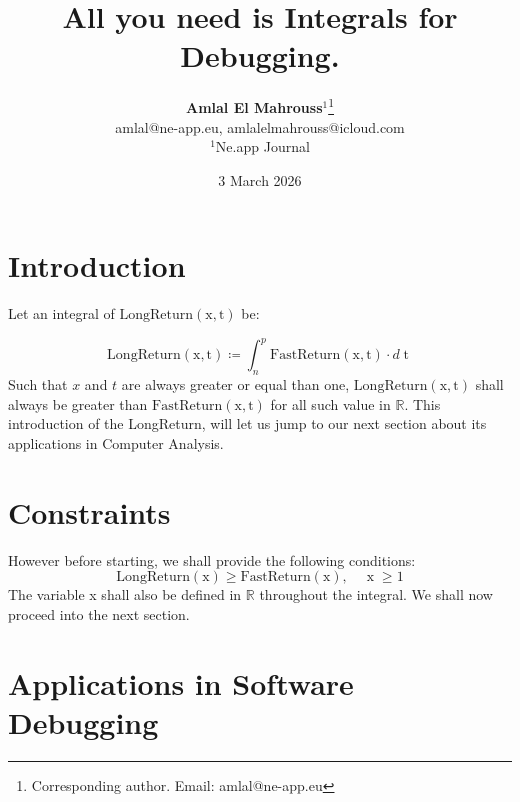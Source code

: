 \documentclass[10pt, twocolumn]{article}
\title{%
  \vspace{-1.5em}%
  \large\textbf{All you need is Integrals for Debugging.}%
}
\author{%
  \textbf{Amlal El Mahrouss}$^{1}$\thanks{Corresponding author. Email: amlal@ne-app.eu}
  \\amlal@ne-app.eu, amlalelmahrouss@icloud.com\\[0.4em]
  \small $^{1}$Ne.app Journal
}
\date{%
  \small 3 March 2026
}
\theoremstyle{plain}
\theoremstyle{definition}
\theoremstyle{remark}
\begin{document}

\section{Introduction}
\label{sec:cl-example-integrals}

Let an integral of $\operatorname{LongReturn(x, t)}$ be:

\begin{equation}
    \operatorname{LongReturn(x, t)} \coloneqq \int_{n}^{p} \operatorname{FastReturn(x, t)} \cdot d\operatorname{t}
\end{equation}
Such that $x$ and $t$ are always greater or equal than one, $\operatorname{LongReturn(x, t)}$ shall always be greater than $\operatorname{FastReturn(x, t)}$ for all such value in $\mathbb{R}$.
This introduction of the LongReturn, will let us jump to our next section about its applications in Computer Analysis.

\section{Constraints}

However before starting, we shall provide the following conditions:
\begin{equation}
    \operatorname{LongReturn(x)} \geq \operatorname{FastReturn(x)}, \quad \operatorname{x} \geq 1
\end{equation}
The variable x shall also be defined in $\mathbb{R}$ throughout the integral. We shall now proceed into the next section.

\section{Applications in Software Debugging}
\end{document}
